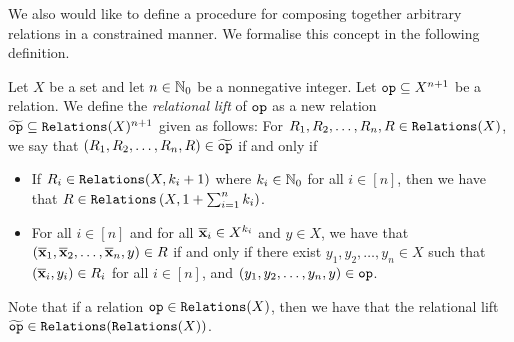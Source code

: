 
We also would like to define a procedure for composing together arbitrary relations in a constrained manner. We formalise this concept in the following definition.

\begin{definition}\label{def:relationalLift}
    Let $X$ be a set and let $n \in \mathbb{N}_0$ be a nonnegative integer. Let $\texttt{op} \subseteq X^{n+1}$ be a relation. We define the \emph{relational lift} of $\texttt{op}$ as a new relation $\widetilde{\texttt{op}} \subseteq \texttt{Relations}(X)^{n+1}$ given as follows: For $R_1, R_2, \dots, R_n, R \in \texttt{Relations}(X)$, we say that $(R_1, R_2, \dots, R_n, R) \in \widetilde{\texttt{op}}$ if and only if
    \begin{itemize}
        \item If $R_i \in \texttt{Relations}(X, k_i+1)$ where $k_i \in \mathbb{N}_0$ for all $i \in [n]$, then we have that $R \in \texttt{Relations}\left(X, 1 + \sum_{i=1}^n k_i\right)$.
        \item For all $i \in [n]$ and for all $\overline{\textbf{x}}_i \in X^{k_i}$ and $y \in X$, we have that $(\overline{\textbf{x}}_1, \overline{\textbf{x}}_2, \dots, \overline{\textbf{x}}_n, y) \in R$ if and only if there exist $y_1, y_2, \dots, y_n \in X$ such that $(\overline{\textbf{x}}_i, y_i) \in R_i$ for all $i \in [n]$, and $(y_1, y_2, \dots, y_n, y) \in \texttt{op}$.
    \end{itemize}
\end{definition}

Note that if a relation $\texttt{op} \in \texttt{Relations}(X)$, then we have that the relational lift $\widetilde{\texttt{op}} \in \texttt{Relations}(\texttt{Relations}(X))$.